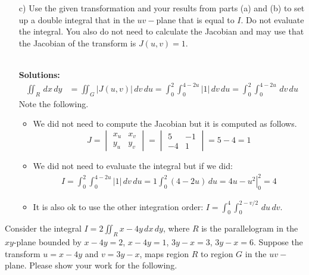 \begin{enumerate}
        \item[c)] Use the given transformation and your results from parts (a) and (b) to set up a double integral that in the $uv-$plane that is equal to $I$. Do not evaluate the integral. You also do not need to calculate the Jacobian and may use that the Jacobian of the transform is $J(u,v) = 1$.
            \ifnum {} {\color{DarkBlue} \\[12pt] 
            \textbf{Solutions:}
            \begin{align}
                \iint_{R} \,dx\,dy
                &= \iint_{G}  \left| J(u,v) \right| \,dv\,du 
                = \int_0^2\int_{0}^{4-2u}  \left| 1 \right| \,dv\,du 
                = \int_0^2\int_{0}^{4-2u} \,dv\,du
            \end{align}
            Note the following.
            \begin{itemize}
                \item We did not need to compute the Jacobian but it is computed as follows. 
                $$J 
                = \begin{vmatrix} x_u & x_v \\ y_u & y_v \end{vmatrix} 
                = \begin{vmatrix} 5 & -1 \\ -4 & 1\end{vmatrix} 
                = 5 - 4
                = 1$$
                \item             We did not need to evaluate the integral but if we did:
            \begin{align}
                I = \int_0^2\int_{0}^{4-2u}  \left| 1 \right| \,dv\,du
                = 1 \int_0^2 (4-2u) \,du
                =  \left. 4u - u^2 \right|_0^2 
                = 4
            \end{align}
            \item It is also ok to use the other integration order: $I = \int_0^4\int_0^{2-v/2} \, du \, dv$.
            \end{itemize}
            } 
            \else 
            \fi        
    \end{enumerate}
 
\fi 



\ifnum {}
    \question[6] Consider the integral $\displaystyle I = 2\iint_{R} x-4y \,dx\,dy$, where $R$ is the parallelogram in the $xy$-plane bounded by $x-4y=2$, $x-4y=1$, $3y-x=3$, $3y-x=6$. Suppose the transform $u=x-4y$ and $v=3y-x$, maps region $R$ to region $G$ in the $uv-$plane.  Please show your work for the following.

